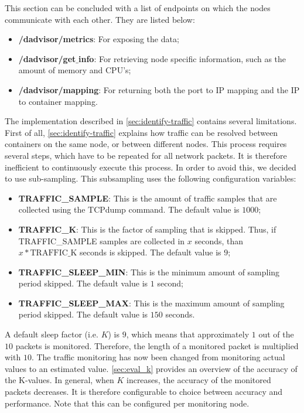 \noindent
This section can be concluded with a list of endpoints on which the nodes communicate with each other. They are listed below:
\begin{itemize}
    \item \textbf{/dadvisor/metrics}: For exposing the data;
    \item \textbf{/dadvisor/get$\_$info}: For retrieving node specific information, such as the amount of memory and CPU's;
    \item \textbf{/dadvisor/mapping}: For returning both the port to IP mapping and the IP to container mapping.
\end{itemize}

\noindent
The implementation described in \autoref{sec:identify-traffic} contains several limitations. First of all, \autoref{sec:identify-traffic} explains how traffic can be resolved between containers on the same node, or between different nodes. This process requires several steps, which have to be repeated for all network packets. It is therefore inefficient to continuously execute this process. In order to avoid this, we decided to use sub-sampling. This subsampling uses the following configuration variables:

\begin{itemize}
    \item \textbf{TRAFFIC\_SAMPLE}: This is the amount of traffic samples that are collected using the TCPdump command. The default value is $1000$;
    \item \textbf{TRAFFIC\_K}: This is the factor of sampling that is skipped. Thus, if TRAFFIC\_SAMPLE samples are collected in $x$ seconds, than $x * \text{TRAFFIC\_K}$ seconds is skipped. The default value is $9$;
    \item \textbf{TRAFFIC\_SLEEP\_MIN}: This is the minimum amount of sampling period skipped. The default value is $1$ second;
    \item \textbf{TRAFFIC\_SLEEP\_MAX}: This is the maximum amount of sampling period skipped. The default value is $150$ seconds.
\end{itemize}

\noindent
A default sleep factor (i.e. $K$) is $9$, which means that approximately $1$ out of the $10$ packets is monitored. Therefore, the length of a monitored packet is multiplied with $10$. The traffic monitoring has now been changed from monitoring actual values to an estimated value. \autoref{sec:eval_k} provides an overview of the accuracy of the K-values. In general, when $K$ increases, the accuracy of the monitored packets decreases. It is therefore configurable to choice between accuracy and performance. Note that this can be configured per monitoring node.\\

